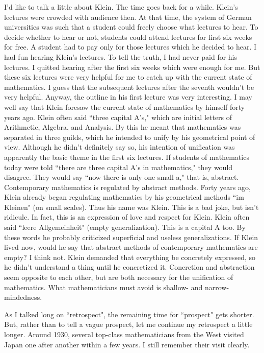 \documentclass[11pt,a4j,twocolumn]{jarticle}
\begin{document}
I'd like to talk a little about Klein. The time goes back for a while.
Klein's lectures were crowded with audience then.
At that time, the system of German universities was such that
a student could freely choose what lectures to hear.
To decide whether to hear or not, students could attend lectures for first six weeks for free.
A student had to pay only for those lectures which he decided to hear.
I had fun hearing Klein's lectures. To tell the truth, I had never paid for his lectures.
I quitted hearing after the first six weeks which were enough for me.
But these six lectures were very helpful for me to catch up with the current state of mathematics.
I guess that the subsequent lectures after the seventh wouldn't be very helpful.
Anyway, the outline in his first lecture was very interesting.
I may well say that Klein foresaw the current state of mathematics by himself forty years ago.
Klein often said ``three capital A's," which are initial letters of Arithmetic, Algebra, and Analysis.
By this he meant that mathematics was separated in three guilds,
which he intended to unify by his geometrical point of view.
Although he didn't definitely say so, his intention of unification 
was apparently the basic theme in the first six lectures.
If students of mathematics today were told ``there are three capital A's in mathematics,"
they would disagree.
They would say ``now there is only one small a," that is, abstract.
Contemporary mathematics is regulated by abstract methods.
Forty years ago, Klein already began regulating mathematics by his geometrical methods
``im Kleinen" (on small scales). Thus his name was Klein.
This is a bad joke, but isn't ridicule.
In fact, this is an expression of love and respect for Klein.
Klein often said ``leere Allgemeinheit" (empty generalization).
This is a capital A too.
By these words he probably criticized superficial and useless generalizations.
If Klein lived now, would he say that abstract methods of contemporary mathematics are empty?
I think not. Klein demanded that everything be concretely expressed,
so he didn't understand a thing until he concretized it.
Concretion and abstraction seem opposite to each other,
but are both necessary for the unification of mathematics.
What mathematicians must avoid is shallow- and narrow-mindedness.

As I talked long on ``retrospect", the remaining time for ``prospect" gets shorter.
But, rather than to tell a vague prospect, let me continue my retrospect a little longer.
Around 1930, several top-class mathematicians from the West visited Japan
one after another within a few years. I still remember their visit clearly.
\end{document}

